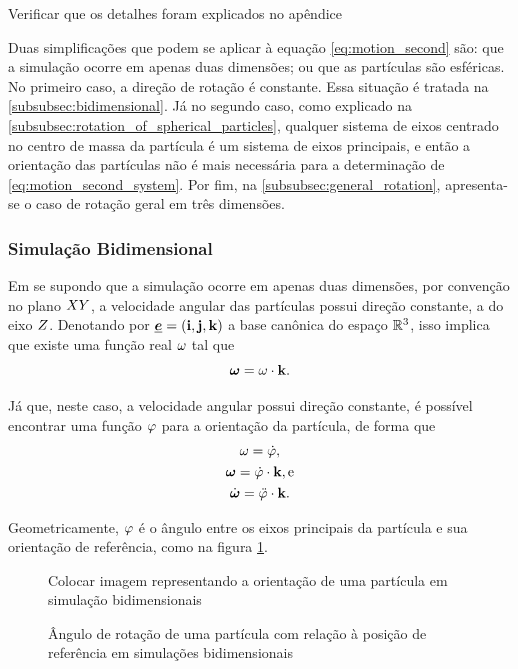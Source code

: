 \alert{Verificar que os detalhes foram explicados no apêndice}

Duas simplificações que podem se aplicar à equação \eqref{eq:motion_second} são: que a simulação ocorre em apenas duas dimensões; ou que as partículas são esféricas. No primeiro caso, a direção de rotação é constante. Essa situação é tratada na \autoref{subsubsec:bidimensional}. Já no segundo caso, como explicado na \autoref{subsubsec:rotation_of_spherical_particles}, qualquer sistema de eixos centrado no centro de massa da partícula é um sistema de eixos principais, e então a orientação das partículas não é mais necessária para a determinação de \eqref{eq:motion_second_system}. Por fim, na \autoref{subsubsec:general_rotation}, apresenta-se o caso de rotação geral em três dimensões.

\subsubsection{Simulação Bidimensional} \label{subsubsec:bidimensional}

Em se supondo que a simulação ocorre em apenas duas dimensões, por convenção no plano \(XY\), a velocidade angular das partículas possui direção constante, a do eixo \(Z\). Denotando por \(\basis = \pqty{\xUnit, \yUnit, \zUnit}\) a base canônica do espaço \(\mathbb{R}^3\), isso implica que existe uma função real \(\omega\) tal que
\[
	\bm{\omega} = \omega\cdot\mathbf{k}.
\]

Já que, neste caso, a velocidade angular possui direção constante, é possível encontrar uma função \(\varphi\) para a orientação da partícula, de forma que
\begin{gather*}
	\angularVelocityScalar = \deriv{1}{\orientationScalar}, \\
	\angularVelocity = \deriv{1}{\orientationScalar}\cdot\zUnit, \text{e} \\
	\angularAcceleration = \deriv{2}{\orientationScalar}\cdot\zUnit.
\end{gather*}

Geometricamente, \(\varphi\) é o ângulo entre os eixos principais da partícula e sua orientação de referência, como na figura \ref{fig:bidimensional_simulation}.

\begin{figure}[h]
	\caption{Ângulo de rotação de uma partícula com relação à posição de referência em simulações bidimensionais}
	\centering
		\alert{Colocar imagem representando a orientação de uma partícula em simulação bidimensionais}
	\label{fig:bidimensional_simulation}
\end{figure}

